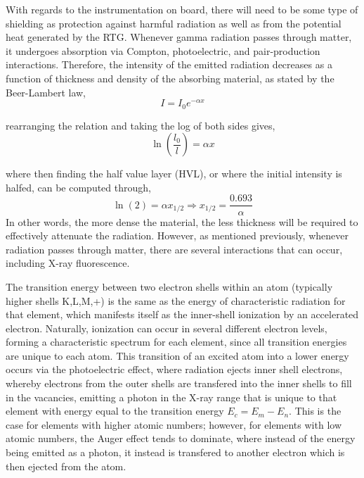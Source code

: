 





With regards to the instrumentation on board, there will need to be some type of shielding as protection against harmful radiation as well as from the potential heat generated by the RTG. Whenever gamma radiation passes through matter, it undergoes absorption via Compton, photoelectric, and pair-production interactions. Therefore, the intensity of the emitted radiation decreases as a function of thickness and density of the absorbing material, as stated by the Beer-Lambert law,
\begin{equation}
I = I_0 e^{-\alpha x}
\end{equation}

rearranging the relation and taking the log of both sides gives,\\
\begin{equation}
\ln\left( \frac{l_0}{l}\right) = \alpha x
\end{equation}

where then finding the half value layer (HVL), or where the initial intensity is halfed, can be computed through,\\
\begin{equation}
\ln(2) = \alpha x_{1/2} \Rightarrow x_{1/2} = \frac{0.693}{\alpha} \label{halfthickness}
\end{equation}
In other words, the more dense the material, the less thickness will be required to effectively attenuate the radiation. However, as mentioned previously, whenever radiation passes through matter, there are several interactions that can occur, including X-ray fluorescence.

The transition energy between two electron shells within an atom (typically higher shells K,L,M,+) is the same as the energy of characteristic radiation for that element, which manifests itself as the inner-shell ionization by an accelerated electron. Naturally, ionization can occur in several different electron levels, forming a characteristic spectrum for each element, since all transition energies are unique to each atom. This transition of an excited atom into a lower energy occurs via the photoelectric effect, where radiation ejects inner shell electrons, whereby electrons from the outer shells are transfered into the inner shells to fill in the vacancies, emitting a photon in the X-ray range that is unique to that element with energy equal to the transition energy $E_c = E_m - E_n$. This is the case for elements with higher atomic numbers; however, for elements with low atomic numbers, the Auger effect tends to dominate, where instead of the energy being emitted as a photon, it instead is transfered to another electron which is then ejected from the atom.

